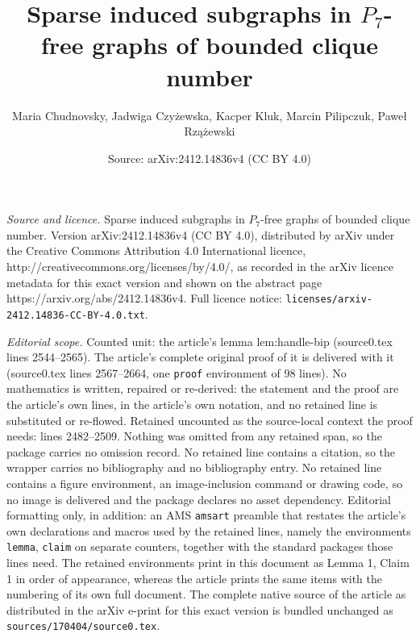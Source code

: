\documentclass[10pt,a4paper]{amsart}
\title{Sparse induced subgraphs in $P_7$-free graphs of bounded clique number}
\author{Maria Chudnovsky, Jadwiga Czy\.zewska, Kacper Kluk, Marcin Pilipczuk, Pawe{\l} Rz\k{a}\.zewski}
\date{Source: arXiv:2412.14836v4 (CC BY 4.0)}
\begin{document}
\maketitle

\noindent\emph{Source and licence.} Sparse induced subgraphs in $P_7$-free graphs of bounded clique number. Version arXiv:2412.14836v4 (CC BY 4.0), distributed by arXiv under the Creative Commons Attribution 4.0 International licence, http://creativecommons.org/licenses/by/4.0/, as recorded in the arXiv licence metadata for this exact version and shown on the abstract page https://arxiv.org/abs/2412.14836v4. Full licence notice: \texttt{licenses/arxiv-2412.14836-CC-BY-4.0.txt}.\par\smallskip

\noindent\textit{Editorial scope.} Counted unit: the article's lemma lem:handle-bip (source0.tex lines 2544--2565). The article's complete original proof of it is delivered with it (source0.tex lines 2567--2664, one \texttt{proof} environment of 98 lines). No mathematics is written, repaired or re-derived: the statement and the proof are the article's own lines, in the article's own notation, and no retained line is substituted or re-flowed.  Retained uncounted as the source-local context the proof needs: lines 2482--2509.  Nothing was omitted from any retained span, so the package carries no omission record.  No retained line contains a citation, so the wrapper carries no bibliography and no bibliography entry.  No retained line contains a figure environment, an image-inclusion command or drawing code, so no image is delivered and the package declares no asset dependency.  Editorial formatting only, in addition: an AMS \texttt{amsart} preamble that restates the article's own declarations and macros used by the retained lines, namely the environments \texttt{lemma}, \texttt{claim} on separate counters, together with the standard packages those lines need.  The retained environments print in this document as Lemma 1, Claim 1 in order of appearance, whereas the article prints the same items with the numbering of its own full document.  The complete native source of the article as distributed in the arXiv e-print for this exact version is bundled unchanged as \texttt{sources/170404/source0.tex}.
\end{document}
